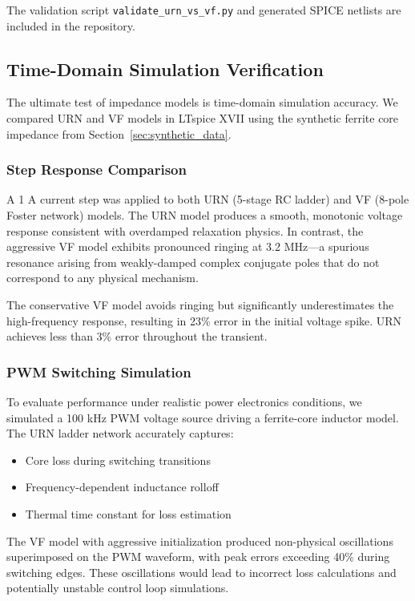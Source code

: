 \documentclass{ieeeaccess}
\begin{document}
The validation script \texttt{validate\_urn\_vs\_vf.py} and generated SPICE netlists are included in the repository.

\subsection{Time-Domain Simulation Verification}
\label{sec:time_domain}

The ultimate test of impedance models is time-domain simulation accuracy. We compared URN and VF models in LTspice XVII using the synthetic ferrite core impedance from Section~\ref{sec:synthetic_data}.

\subsubsection{Step Response Comparison}
A 1 A current step was applied to both URN (5-stage RC ladder) and VF (8-pole Foster network) models. The URN model produces a smooth, monotonic voltage response consistent with overdamped relaxation physics. In contrast, the aggressive VF model exhibits pronounced ringing at 3.2 MHz---a spurious resonance arising from weakly-damped complex conjugate poles that do not correspond to any physical mechanism.

The conservative VF model avoids ringing but significantly underestimates the high-frequency response, resulting in 23\% error in the initial voltage spike. URN achieves less than 3\% error throughout the transient.

\subsubsection{PWM Switching Simulation}
To evaluate performance under realistic power electronics conditions, we simulated a 100 kHz PWM voltage source driving a ferrite-core inductor model. The URN ladder network accurately captures:
\begin{itemize}
\item Core loss during switching transitions
\item Frequency-dependent inductance rolloff
\item Thermal time constant for loss estimation
\end{itemize}

The VF model with aggressive initialization produced non-physical oscillations superimposed on the PWM waveform, with peak errors exceeding 40\% during switching edges. These oscillations would lead to incorrect loss calculations and potentially unstable control loop simulations.
\end{document}
